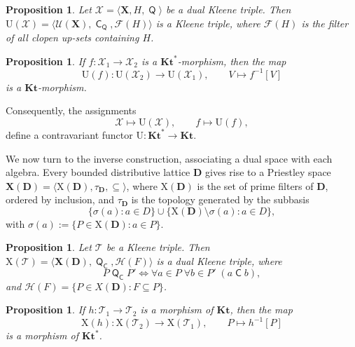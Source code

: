 \documentclass{article}
\newtheorem{proposition}[theorem]{Proposition}
\DeclareMathOperator{\con}{\mathsf{C}}
\DeclareMathOperator{\Q}{\mathsf{Q}}
\newcommand{\D}{\mathbf{D}}
\newcommand{\X}{\mathbf{X}}
\newcommand{\T}{\mathcal{T}}
\newcommand{\U}{\mathcal{U}}
\begin{document}
\begin{proposition}
\label{prop:dual-to-triple}
Let $\mathcal{X} = \langle \X, H, \Q \rangle$ be a dual Kleene triple. Then $\mathrm{U}(\mathcal{X}) = \langle \U(\X), \con_{\Q}, \mathcal{F}(H) \rangle$ is a Kleene triple, where $\mathcal{F}(H)$ is the filter of all clopen up-sets containing $H$.
\end{proposition}

\begin{proposition}
\label{prop:Uf-Kt-morphism}
If $f \colon \mathcal{X}_1 \to \mathcal{X}_2$ is a $\mathbf{Kt}^{*}$-morphism, then the map
\[
\mathrm{U}(f) \colon \mathrm{U}(\mathcal{X}_2) \to \mathrm{U}(\mathcal{X}_1), \qquad V \mapsto f^{-1}[V]
\]
is a $\mathbf{Kt}$-morphism.
\end{proposition}

Consequently, the assignments
\[
\mathcal{X} \longmapsto \mathrm{U}(\mathcal{X}), \qquad f \longmapsto \mathrm{U}(f),
\]
define a contravariant functor $\mathrm{U} \colon \mathbf{Kt}^{*} \longrightarrow \mathbf{Kt}$.

We now turn to the inverse construction, associating a dual space with each algebra. Every bounded distributive lattice $\D$ gives rise to a Priestley space $\X(\D) = \langle \mathrm{X}(\D), \tau_{\D}, \subseteq \rangle$, where $\mathrm{X}(\D)$ is the set of prime filters of $\D$, ordered by inclusion, and $\tau_{\D}$ is the topology generated by the subbasis
\[
\{\sigma(a) : a \in D\} \cup \{\mathrm{X}(\D) \setminus \sigma(a) : a \in D\},
\]
with $\sigma(a) := \{P \in \mathrm{X}(\D) : a \in P\}$.

\begin{proposition}
\label{prop:triple-to-dual}
Let $\T$ be a Kleene triple. Then $\mathrm{X}(\T) = \langle \X(\D), \Q_{\con}, \mathcal{H}(F) \rangle$ is a dual Kleene triple, where
\begin{equation}
\label{eq:dual-contact}
     P\Q_{\con} P' \iff \forall a \in P \; \forall b \in P' \; (a \con b),\tag{DC}
\end{equation}
and $\mathcal{H}(F) = \{P \in X(\D) : F \subseteq P\}$.
\end{proposition}

\begin{proposition}
\label{prop:Xh-Kt-morphism}
If $h \colon \T_1 \to \T_2$ is a morphism of $\mathbf{Kt}$, then the map
\[
\mathrm{X}(h) \colon \mathrm{X}(\T_2) \to \mathrm{X}(\T_1), \qquad P \mapsto h^{-1}[P]
\]
is a morphism of $\mathbf{Kt}^{*}$.
\end{proposition}
\end{document}
